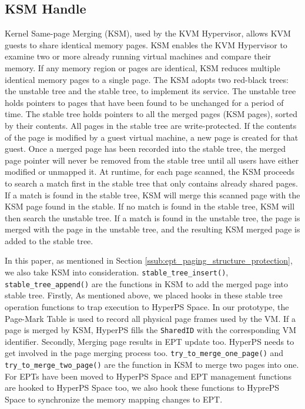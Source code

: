 \subsection{KSM Handle}%
\label{sub:ksm_handle}
Kernel Same-page Merging (KSM), used by the KVM Hypervisor, allows KVM guests to share identical memory pages. 
KSM enables the KVM Hypervisor to examine two or more already running virtual machines and compare their memory. If any memory region or pages are identical, KSM reduces multiple identical memory pages to a single page. 
The KSM adopts two red-black trees: the unstable tree and the stable tree, to implement its service.
The unstable tree holds pointers to pages that have been found to be unchanged for a period of time. 
The stable tree holds pointers to all the merged pages (KSM pages), sorted by their contents. All pages in the stable tree are write-protected. 
If the contents of the page is modified by a guest virtual machine, a new page is created for that guest.
Once a merged page has been recorded into the stable tree, the merged page pointer will never be removed from the stable tree until all users have either modified or unmapped it. 
At runtime, for each page scanned, the KSM proceeds to search a match first in the stable tree that only contains already shared pages. If a match is found in the stable tree, KSM will merge this scanned page with the KSM page found in the stable. 
If no match is found in the stable tree, KSM will then search the unstable tree. If a match is found in the unstable tree, the page is merged with the page in the unstable tree, and the resulting KSM merged page is added to the stable tree. 

In this paper, as mentioned in Section \ref{ssub:ept_paging_structure_protection}, we also take KSM into consideration. 
\verb|stable_tree_insert()|, \verb|stable_tree_append()| are the functions in KSM to add the merged page into stable tree. 
Firstly, As mentioned above, we placed hooks in these stable tree operation functions to trap execution to HyperPS Space. 
In our prototype, the Page-Mark Table is used to record all physical page frames used by the VM. If a page is merged by KSM, HyperPS fills the \verb|SharedID| with the corresponding VM identifier. 
Secondly, Merging page results in EPT update too. HyperPS needs to get involved in the page merging process too. 
\verb|try_to_merge_one_page()| and \verb|try_to_merge_two_page()| are the function in KSM to merge two pages into one. 
For EPTs have been moved to HyperPS Space and EPT management functions are hooked to HyperPS Space too, we also hook these functions to HyprePS Space to synchronize the memory mapping changes to EPT.

